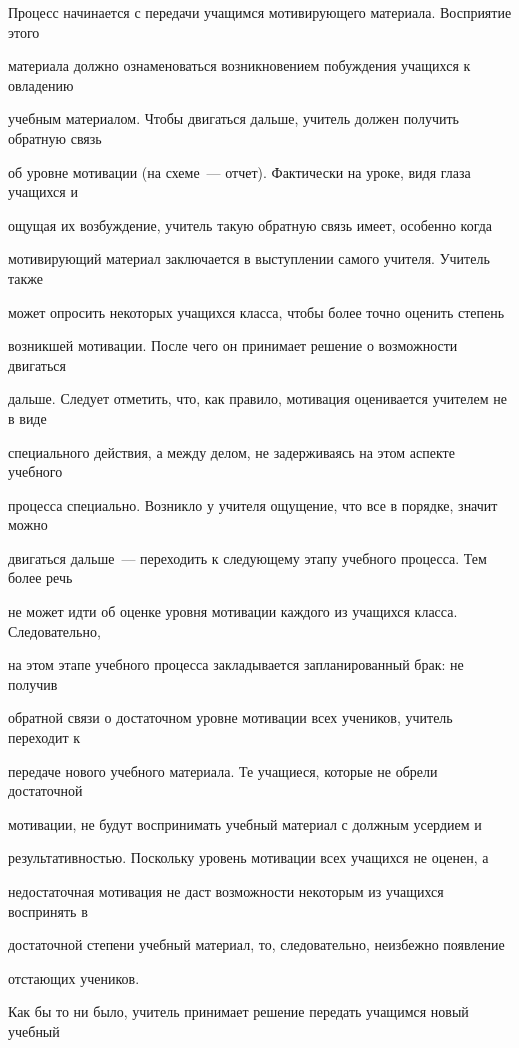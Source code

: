 Процесс начинается с передачи учащимся мотивирующего материала. Восприятие этого 


материала должно ознаменоваться возникновением побуждения учащихся к овладению 


учебным материалом. Чтобы двигаться дальше, учитель должен получить обратную связь 


об уровне мотивации (на схеме~--- отчет). Фактически на уроке, видя глаза учащихся и 


ощущая их возбуждение, учитель такую обратную связь имеет, особенно когда 


мотивирующий материал заключается в выступлении самого учителя. Учитель также 


может опросить некоторых учащихся класса, чтобы более точно оценить степень 


возникшей мотивации. После чего он принимает решение о возможности двигаться 


дальше. Следует отметить, что, как правило, мотивация оценивается учителем не в виде 


специального действия, а между делом, не задерживаясь на этом аспекте учебного 


процесса специально. Возникло у учителя ощущение, что все в порядке, значит можно 


двигаться дальше~--- переходить к следующему этапу учебного процесса. Тем более речь 


не может идти об оценке уровня мотивации каждого из учащихся класса. Следовательно, 


на этом этапе учебного процесса закладывается запланированный брак: не получив 


обратной связи о достаточном уровне мотивации всех учеников, учитель переходит к 


передаче нового учебного материала. Те учащиеся, которые не обрели достаточной 


мотивации, не будут воспринимать учебный материал с должным усердием и 


результативностью. Поскольку уровень мотивации всех учащихся не оценен, а 


недостаточная мотивация не даст возможности некоторым из учащихся воспринять в 


достаточной степени учебный материал, то, следовательно, неизбежно появление 


отстающих учеников.





Как бы то ни было, учитель принимает решение передать учащимся новый учебный 


